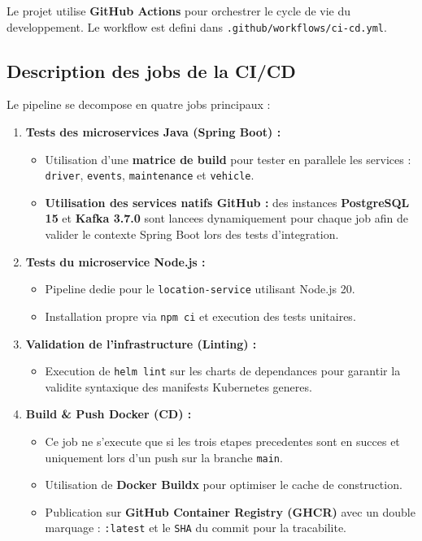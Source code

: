 \documentclass[12pt,a4paper]{article}
\begin{document}
\vspace{0.3cm}

Le projet utilise \textbf{GitHub Actions} pour orchestrer le cycle de vie du developpement. Le workflow est defini dans \texttt{.github/workflows/ci-cd.yml}.
  
\subsection{Description des jobs de la CI/CD}
                       
Le pipeline se decompose en quatre jobs principaux :

\begin{enumerate}[leftmargin=*, label=\textbf{\arabic*.}]
  \item \textbf{Tests des microservices Java (Spring Boot) :}
        \begin{itemize}
          \item Utilisation d'une \textbf{matrice de build} pour tester en parallele les services : \texttt{driver}, \texttt{events}, \texttt{maintenance} et \texttt{vehicle}.
\item \textbf{Utilisation des services natifs GitHub :} des instances \textbf{PostgreSQL 15} et \textbf{Kafka 3.7.0} sont lancees dynamiquement pour chaque job afin de valider le contexte Spring Boot lors des tests d'integration.
        \end{itemize}

  \item \textbf{Tests du microservice Node.js :}
        \begin{itemize}
          \item Pipeline dedie pour le \texttt{location-service} utilisant Node.js 20.
          \item Installation propre via \texttt{npm ci} et execution des tests unitaires.
        \end{itemize}

  \item \textbf{Validation de l'infrastructure (Linting) :}
        \begin{itemize}
          \item Execution de \texttt{helm lint} sur les charts de dependances pour garantir la validite syntaxique des manifests Kubernetes generes.
        \end{itemize}

  \item \textbf{Build \& Push Docker (CD) :}
        \begin{itemize}
          \item Ce job ne s'execute que si les trois etapes precedentes sont en succes et uniquement lors d'un push sur la branche \texttt{main}.
          \item Utilisation de \textbf{Docker Buildx} pour optimiser le cache de construction.
          \item Publication sur \textbf{GitHub Container Registry (GHCR)} avec un double marquage : \texttt{:latest} et le \texttt{SHA} du commit pour la tracabilite.
        \end{itemize}
\end{enumerate}
\end{document}
